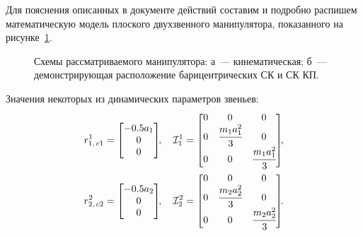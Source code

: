 \label{app_examples}
Для пояснения описанных в документе действий составим и подробно распишем математическую модель плоского двухзвенного манипулятора, показанного на рисунке~\ref{img_manipulator_2}.

\begin{figure}[h!]
    \begin{minipage}[h]{0.5\linewidth}
    \end{minipage}
    \hfill
    \begin{minipage}[h]{0.5\linewidth}
    \end{minipage}
    \caption{Схемы рассматриваемого манипулятора: а~--- кинематическая; б~--- демонстрирующая расположение барицентрических СК и СК КП.}
    \label{img_manipulator_2}
\end{figure}

Значения некоторых из динамических параметров звеньев:
\begin{gather}
    r^1_{1,\,c1} =
    \begin{bmatrix}
        -0.5 a_1 \\ 0 \\ 0
    \end{bmatrix}\!\!,
    \quad
    \mathcal{I}^{1}_1 =
    \begin{bmatrix}
        0 & 0 & 0 \\
        0 & \cfrac{m_1 a_1^2}{3} & 0 \\
        0 & 0 & \cfrac{m_1 a_1^2}{3}
    \end{bmatrix}\!\!,
    \\
    r^2_{2,\,c2} =
    \begin{bmatrix}
        -0.5 a_2 \\ 0 \\ 0
    \end{bmatrix}\!\!,
    \quad
    \mathcal{I}^{2}_2 =
    \begin{bmatrix}
        0 & 0 & 0 \\
        0 & \cfrac{m_2 a_2^2}{3} & 0 \\
        0 & 0 & \cfrac{m_2 a_2^2}{3}
    \end{bmatrix}\!\!\ldotp
\end{gather}

